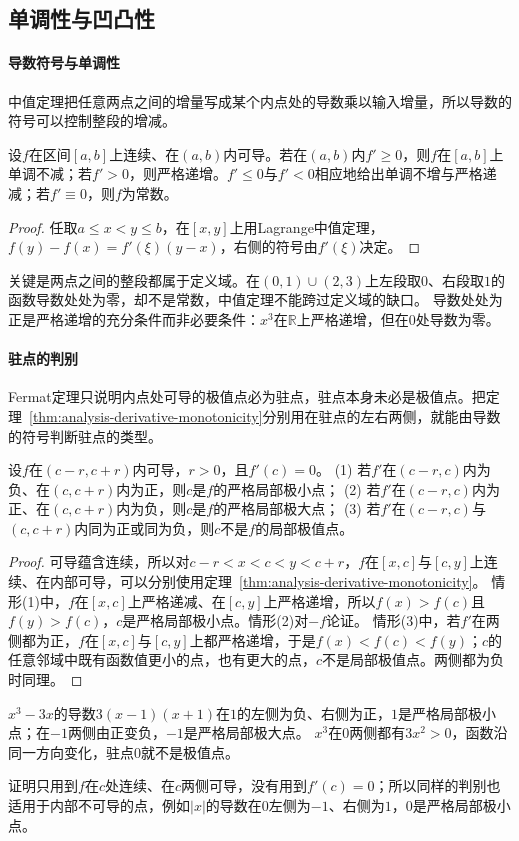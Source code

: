 \subsection{单调性与凹凸性}
\label{sec:ru-monotonicity-convexity}
\label{sec:analysis-monotonicity}

\paragraph{导数符号与单调性}
中值定理把任意两点之间的增量写成某个内点处的导数乘以输入增量，所以导数的符号可以控制整段的增减。
\begin{theorem}[导数符号与单调性]
\label{thm:analysis-derivative-monotonicity}
设$f$在区间$[a,b]$上连续、在$(a,b)$内可导。若在$(a,b)$内$f'\geq0$，则$f$在$[a,b]$上单调不减；若$f'>0$，则严格递增。$f'\leq0$与$f'<0$相应地给出单调不增与严格递减；若$f'\equiv0$，则$f$为常数。
\end{theorem}
\begin{proof}
任取$a\leq x<y\leq b$，在$[x,y]$上用Lagrange中值定理，$f(y)-f(x)=f'(\xi)(y-x)$，右侧的符号由$f'(\xi)$决定。
\end{proof}
关键是两点之间的整段都属于定义域。在$(0,1)\cup(2,3)$上左段取$0$、右段取$1$的函数导数处处为零，却不是常数，中值定理不能跨过定义域的缺口。
导数处处为正是严格递增的充分条件而非必要条件：$x^3$在$\mathbb R$上严格递增，但在$0$处导数为零。

\paragraph{驻点的判别}
Fermat定理只说明内点处可导的极值点必为驻点，驻点本身未必是极值点。把定理~\ref{thm:analysis-derivative-monotonicity}分别用在驻点的左右两侧，就能由导数的符号判断驻点的类型。
\begin{theorem}[驻点的一阶判别]
\label{thm:ru-first-derivative-test}
设$f$在$(c-r,c+r)$内可导，$r>0$，且$f'(c)=0$。
(1) 若$f'$在$(c-r,c)$内为负、在$(c,c+r)$内为正，则$c$是$f$的严格局部极小点；
(2) 若$f'$在$(c-r,c)$内为正、在$(c,c+r)$内为负，则$c$是$f$的严格局部极大点；
(3) 若$f'$在$(c-r,c)$与$(c,c+r)$内同为正或同为负，则$c$不是$f$的局部极值点。
\end{theorem}
\begin{proof}
可导蕴含连续，所以对$c-r<x<c<y<c+r$，$f$在$[x,c]$与$[c,y]$上连续、在内部可导，可以分别使用定理~\ref{thm:analysis-derivative-monotonicity}。
情形(1)中，$f$在$[x,c]$上严格递减、在$[c,y]$上严格递增，所以$f(x)>f(c)$且$f(y)>f(c)$，$c$是严格局部极小点。情形(2)对$-f$论证。
情形(3)中，若$f'$在两侧都为正，$f$在$[x,c]$与$[c,y]$上都严格递增，于是$f(x)<f(c)<f(y)$；$c$的任意邻域中既有函数值更小的点，也有更大的点，$c$不是局部极值点。两侧都为负时同理。
\end{proof}
\begin{example}[用一阶判别区分驻点]
\label{ex:ru-first-derivative-test}
$x^3-3x$的导数$3(x-1)(x+1)$在$1$的左侧为负、右侧为正，$1$是严格局部极小点；在$-1$两侧由正变负，$-1$是严格局部极大点。
$x^3$在$0$两侧都有$3x^2>0$，函数沿同一方向变化，驻点$0$就不是极值点。
\end{example}
证明只用到$f$在$c$处连续、在$c$两侧可导，没有用到$f'(c)=0$；所以同样的判别也适用于内部不可导的点，例如$|x|$的导数在$0$左侧为$-1$、右侧为$1$，$0$是严格局部极小点。

